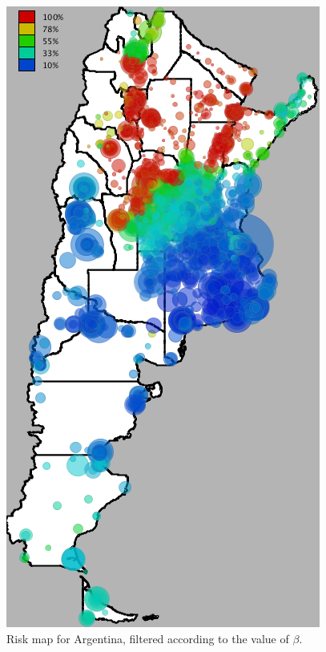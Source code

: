 \begin{figure}[h!]
	\caption{Risk map for Argentina, filtered according to the value of $\beta$.}
	\label{fig:mapa_argentina}
	\begin{minipage}{.495\linewidth}
		\centering
		\includegraphics[width=0.90\linewidth]
		{figures/201112_hi_res_argentina_usuarios_proporcion_circulos_beta1/201112_hi_res_argentina_usuarios_proporcion_circulos_beta1}


\end{minipage}
\end{figure}
